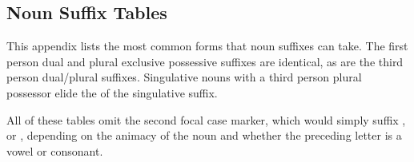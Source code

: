 \documentclass[grammar]{subfiles}
\begin{document}
\begin{landscape}

  \appendix
  \chapter{Noun Suffix Tables}
  \label{app:noun_suffix_tables}

  This appendix lists the most common forms that noun suffixes can take.  The
  first person dual and plural exclusive possessive suffixes are identical, as
  are the third person dual/plural suffixes.  Singulative nouns with a third
  person plural possessor elide the  of the singulative suffix.

  All of these tables omit the second focal case marker, which would simply
  suffix ,  or , depending on the animacy of
  the noun and whether the preceding letter is a vowel or consonant.



\end{landscape}
\end{document}
